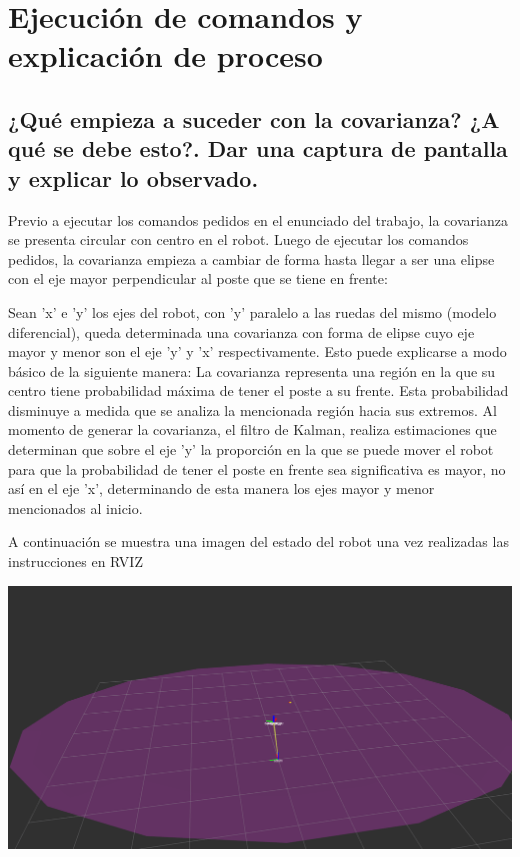 \documentclass[a4paper]{article}
\theoremstyle{plain}
\theoremstyle{remark}
\theoremstyle{definition}
\begin{document}

\maketitle
\thispagestyle{empty}
\newpage
\section{Ejecución de comandos y explicación de proceso}

\subsection{¿Qué empieza a suceder con la covarianza? ¿A qué se debe esto?. Dar una captura de pantalla y explicar lo observado.}

Previo a ejecutar los comandos pedidos en el enunciado del trabajo, la covarianza se presenta circular con centro en el robot. Luego de ejecutar los comandos pedidos, la covarianza empieza a cambiar de forma hasta llegar a ser una elipse con el eje mayor perpendicular al poste que se tiene en frente:

Sean 'x' e 'y' los ejes del robot, con 'y' paralelo a las ruedas del mismo (modelo diferencial), queda determinada una covarianza con forma de elipse cuyo eje mayor y menor son el eje 'y' y 'x' respectivamente. Esto puede explicarse a modo básico de la siguiente manera: La covarianza representa una región en la que su centro tiene probabilidad máxima de tener el poste a su frente. Esta probabilidad disminuye a medida que se analiza la mencionada región hacia sus extremos. Al momento de generar la covarianza, el filtro de Kalman, realiza estimaciones que determinan que sobre el eje 'y' la proporción en la que se puede mover el robot para que la probabilidad de tener el poste en frente sea significativa es mayor, no así en el eje 'x', determinando de esta manera los ejes mayor y menor mencionados al inicio.


A continuación se muestra una imagen del estado del robot una vez realizadas las instrucciones en RVIZ
\begin{center}
\includegraphics[scale=0.4]{tp3_ej1.png}
\end{center}
\end{document}
